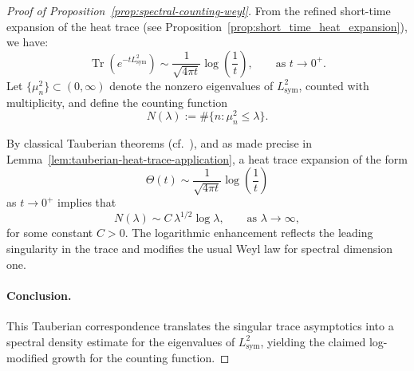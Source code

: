 \begin{proof}[Proof of Proposition~\ref{prop:spectral-counting-weyl}]
From the refined short-time expansion of the heat trace (see Proposition~\ref{prop:short_time_heat_expansion}), we have:
\[
\operatorname{Tr}(e^{-t L_{\mathrm{sym}}^2}) \sim \frac{1}{\sqrt{4\pi t}} \log\left( \frac{1}{t} \right), \qquad \text{as } t \to 0^+.
\]
Let \( \{ \mu_n^2 \} \subset (0, \infty) \) denote the nonzero eigenvalues of \( L_{\mathrm{sym}}^2 \), counted with multiplicity, and define the counting function
\[
N(\lambda) := \#\{ n : \mu_n^2 \leq \lambda \}.
\]

By classical Tauberian theorems (cf.~\cite[Thm.~4.12.9]{Korevaar2004Tauberian}), and as made precise in Lemma~\ref{lem:tauberian-heat-trace-application}, a heat trace expansion of the form
\[
\Theta(t) \sim \frac{1}{\sqrt{4\pi t}} \log\left( \frac{1}{t} \right)
\]
as \( t \to 0^+ \) implies that
\[
N(\lambda) \sim C \, \lambda^{1/2} \log \lambda, \qquad \text{as } \lambda \to \infty,
\]
for some constant \( C > 0 \). The logarithmic enhancement reflects the leading singularity in the trace and modifies the usual Weyl law for spectral dimension one.

\paragraph{Conclusion.}
This Tauberian correspondence translates the singular trace asymptotics into a spectral density estimate for the eigenvalues of \( L_{\mathrm{sym}}^2 \), yielding the claimed log-modified growth for the counting function.
\end{proof}
